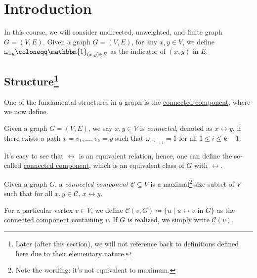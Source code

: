 \chapter{Introduction}

In this course, we will consider undirected, unweighted, and finite graph \(G = (V, E)\). Given a graph \(G = (V, E)\), for any \(x, y \in V\), we define \(\omega _{xy} \coloneqq \mathbbm{1}_{(x, y) \in E} \) as the indicator of \((x, y)\) in \(E\).

\section[Structure]{Structure\protect\footnote{Later (after this section), we will not reference back to definitions defined here due to their elementary nature.}}
One of the fundamental structures in a graph is the \hyperref[def:connected-component]{connected component}, where we now define.

\begin{definition}[Connected]\label{def:connected}
	Given a graph \(G = (V, E)\), we say \(x, y \in V\) is \emph{connected}, denoted as \(x \leftrightarrow y\), if there exists a path \(x = v_1, \dots, v_k = y\) such that \(\omega _{v_i v_{i+1}} = 1\) for all \(1 \leq i \leq k-1\).
\end{definition}

It's easy to see that \(\leftrightarrow \) is an equivalent relation, hence, one can define the so-called \hyperref[def:connected-component]{connected component}, which is an equivalent class of \(G\) with \(\leftrightarrow \).

\begin{definition}\label{def:connected-component}
	Given a graph \(G\), a \emph{connected component} \(\mathcal{C} \subseteq V\) is a maximal\footnote{Note the wording: it's not equivalent to maximum.} size subset of \(V\) such that for all \(x, y \in \mathcal{C} \), \(x \leftrightarrow y\).
\end{definition}

\begin{notation}
	For a particular vertex \(v \in V\), we define \(\mathcal{C} (v, G) \coloneqq \{ u \mid u \leftrightarrow v \text{ in } G\} \) as the \hyperref[def:connected-component]{connected component} containing \(v\). If \(G\) is realized, we simply write \(\mathcal{C} (v)\).
\end{notation}


